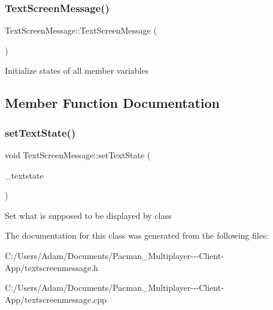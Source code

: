 \subsubsection{\texorpdfstring{Text\+Screen\+Message()}{TextScreenMessage()}}
{\footnotesize\ttfamily Text\+Screen\+Message\+::\+Text\+Screen\+Message (\begin{DoxyParamCaption}{ }\end{DoxyParamCaption})}

Initialize states of all member variables 

\subsection{Member Function Documentation}
\mbox{\label{class_text_screen_message_aba833b25e9b57517d22d43560ceec249}} 
\subsubsection{\texorpdfstring{set\+Text\+State()}{setTextState()}}
{\footnotesize\ttfamily void Text\+Screen\+Message\+::set\+Text\+State (\begin{DoxyParamCaption}\item[{Q\+String}]{\+\_\+textstate }\end{DoxyParamCaption})}

Set what is supposed to be displayed by class 

The documentation for this class was generated from the following files\+:\begin{DoxyCompactItemize}
\item 
C\+:/\+Users/\+Adam/\+Documents/\+Pacman\+\_\+\+Multiplayer-\/-\/-\/\+Client-\/\+App/textscreenmessage.\+h\item 
C\+:/\+Users/\+Adam/\+Documents/\+Pacman\+\_\+\+Multiplayer-\/-\/-\/\+Client-\/\+App/textscreenmessage.\+cpp\end{DoxyCompactItemize}
